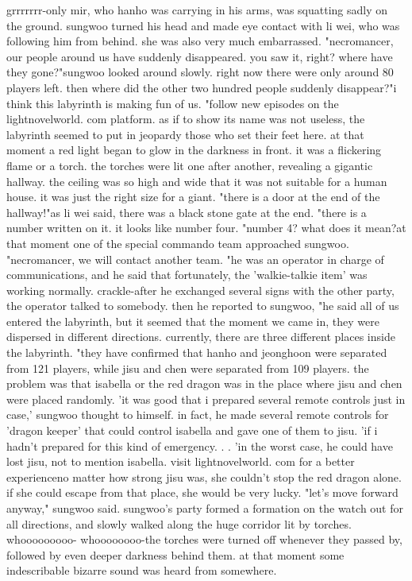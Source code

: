 grrrrrrr-only mir, who hanho was carrying in his arms, was squatting sadly on the ground.
 sungwoo turned his head and made eye contact with li wei, who was following him from behind.
 she was also very much embarrassed.
 "necromancer, our people around us have suddenly disappeared.
 you saw it, right? where have they gone?"sungwoo looked around slowly.
 right now there were only around 80 players left.
 then where did the other two hundred people suddenly disappear?"i think this labyrinth is making fun of us.
"follow new episodes on the lightnovelworld.
com platform.
as if to show its name was not useless, the labyrinth seemed to put in jeopardy those who set their feet here.
at that moment a red light began to glow in the darkness in front.
it was a flickering flame or a torch.
 the torches were lit one after another, revealing a gigantic hallway.
 the ceiling was so high and wide that it was not suitable for a human house.
 it was just the right size for a giant.
"there is a door at the end of the hallway!"as li wei said, there was a black stone gate at the end.
"there is a number written on it.
 it looks like number four.
"number 4? what does it mean?at that moment one of the special commando team approached sungwoo.
 "necromancer, we will contact another team.
"he was an operator in charge of communications, and he said that fortunately, the 'walkie-talkie item' was working normally.
crackle-after he exchanged several signs with the other party, the operator talked to somebody.
then he reported to sungwoo, "he said all of us entered the labyrinth, but it seemed that the moment we came in, they were dispersed in different directions.
 currently, there are three different places inside the labyrinth.
"they have confirmed that hanho and jeonghoon were separated from 121 players, while jisu and chen were separated from 109 players.
the problem was that isabella or the red dragon was in the place where jisu and chen were placed randomly.
 'it was good that i prepared several remote controls just in case,' sungwoo thought to himself.
 in fact, he made several remote controls for 'dragon keeper' that could control isabella and gave one of them to jisu.
'if i hadn't prepared for this kind of emergency.
.
.
'in the worst case, he could have lost jisu, not to mention isabella.
visit lightnov­elworld.
c‌om for a better experienceno matter how strong jisu was, she couldn't stop the red dragon alone.
 if she could escape from that place, she would be very lucky.
"let's move forward anyway," sungwoo said.
sungwoo's party formed a formation on the watch out for all directions, and slowly walked along the huge corridor lit by torches.
whooooooooo- whoooooooo-the torches were turned off whenever they passed by, followed by even deeper darkness behind them.
at that moment some indescribable bizarre sound was heard from somewhere.
 

